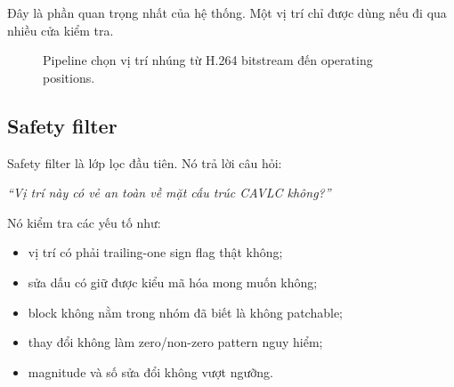 \documentclass[11pt,a4paper]{article}
\begin{document}
Đây là phần quan trọng nhất của hệ thống. Một vị trí chỉ được dùng nếu đi qua
nhiều cửa kiểm tra.

\begin{figure}[H]
\centering
{}
\caption{Pipeline chọn vị trí nhúng từ H.264 bitstream đến operating positions.}
\label{fig:position-pipeline}
\end{figure}

\subsection{Safety filter}

Safety filter là lớp lọc đầu tiên. Nó trả lời câu hỏi:

\begin{center}
\textit{``Vị trí này có vẻ an toàn về mặt cấu trúc CAVLC không?''}
\end{center}

Nó kiểm tra các yếu tố như:

\begin{itemize}[leftmargin=*]
  \item vị trí có phải trailing-one sign flag thật không;
  \item sửa dấu có giữ được kiểu mã hóa mong muốn không;
  \item block không nằm trong nhóm đã biết là không patchable;
  \item thay đổi không làm zero/non-zero pattern nguy hiểm;
  \item magnitude và số sửa đổi không vượt ngưỡng.
\end{itemize}
\end{document}
